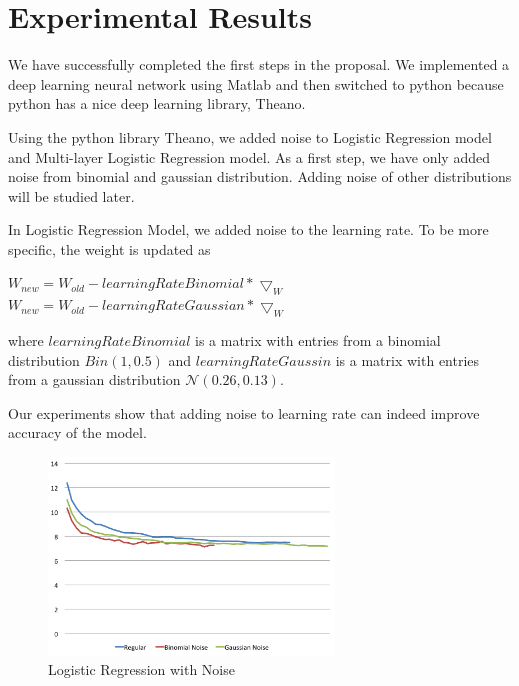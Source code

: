 \section{Experimental Results}
\label{sec:result}

We have successfully completed the first steps in the proposal.
We implemented a deep learning neural network using Matlab and then
switched to python because python has a nice deep learning library,
Theano.

Using the python library Theano, we added noise to Logistic Regression
model and Multi-layer Logistic Regression model.
As a first step, we have only added noise from binomial and gaussian
distribution. Adding noise of other distributions will be studied later.

In Logistic Regression Model, we added noise to the learning rate.
To be more specific, the weight is updated as

\begin{center}
$W_{new} = W_{old} - learningRateBinomial * \bigtriangledown_{W}$
$W_{new} = W_{old} - learningRateGaussian * \bigtriangledown_{W}$
\end{center}

where $learningRateBinomial$ is a matrix with entries from a binomial
distribution $Bin(1,0.5)$ and $learningRateGaussin$ is a matrix with entries
from a gaussian distribution $\mathcal{N}(0.26,0.13)$.

Our experiments show that adding noise to learning rate can indeed
improve accuracy of the model.

\begin{figure}[h]
\centering
\includegraphics[width=215pt]{figs/logistic_sgd_all.png}
\caption{Logistic Regression with Noise}
\label{fig:logistic-sgd}
\end{figure}

